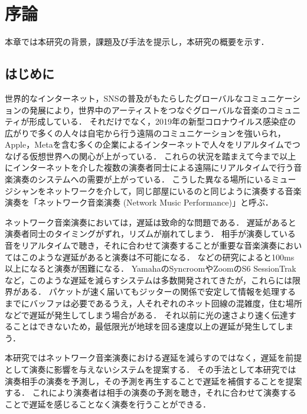 \chapter{序論}
\label{introduction}

本章では本研究の背景，課題及び手法を提示し，本研究の概要を示す．

\section{はじめに}
\label{introduction:background}

世界的なインターネット，SNSの普及がもたらしたグローバルなコミュニケーションの発展により，世界中のアーティストをつなぐグローバルな音楽のコミュニティが形成している．
それだけでなく，2019年の新型コロナウイルス感染症の広がりで多くの人々は自宅から行う遠隔のコミュニケーションを強いられ，Apple，Metaを含む多くの企業によるインターネットで人々をリアルタイムでつなげる仮想世界への関心が上がっている．
これらの状況を踏まえて今まで以上にインターネットを介した複数の演奏者同士による遠隔にリアルタイムで行う音楽演奏のシステムへの需要が上がっている．
こうした異なる場所にいるミュージシャンをネットワークを介して，同じ部屋にいるのと同じように演奏する音楽演奏を「ネットワーク音楽演奏 (Network Music Performance)\cite{lazzaro}」と呼ぶ．

ネットワーク音楽演奏においては，遅延は致命的な問題である．
遅延があると演奏者同士のタイミングがずれ，リズムが崩れてしまう．
相手が演奏している音をリアルタイムで聴き，それに合わせて演奏することが重要な音楽演奏においてはこのような遅延があると演奏は不可能になる．
\cite{latency:effect}などの研究によると100ms以上になると演奏が困難になる．
YamahaのSyncroom\cite{syncroom}やZoomのS6 SessionTrakなど，このような遅延を減らすシステムは多数開発されてきたが，これらには限界がある．
パケットが速く届いてもジッターの関係で安定して情報を処理するまでにバッファは必要であるうえ，人それぞれのネット回線の混雑度，住む場所などで遅延が発生してしまう場合がある．
それ以前に光の速さより速く伝達することはできないため，最低限光が地球を回る速度以上の遅延が発生してしまう．

本研究ではネットワーク音楽演奏における遅延を減らすのではなく，遅延を前提として演奏に影響を与えないシステムを提案する．
その手法として本研究では演奏相手の演奏を予測し，その予測を再生することで遅延を補償することを提案する．
\cite{nmpbook}
\cite{admet}
\cite{admet:experiment}
\cite{alexandraki:2013}
\cite{alexandraki:2014}
\cite{tablanet}
これにより演奏者は相手の演奏の予測を聴き，それに合わせて演奏することで遅延を感じることなく演奏を行うことができる．

